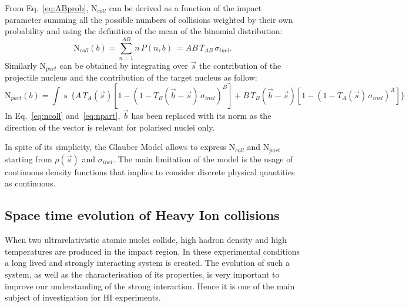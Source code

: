 From Eq.~\eqref{eq:ABprob}, $\mathrm{N}_{coll}$ can be derived as a function of the impact parameter 
summing all the possible numbers of collisions weighted by their own probability and using the
definition of the mean of the binomial distribution:
\begin{equation} \label{eq:ncoll}
    \mathrm{N}_{coll}(b) = \sum_{n=1}^{AB} n\, P(n,b) \ = AB\, T_{AB}\, \sigma_{inel}.
\end{equation}
Similarly $\mathrm{N}_{part}$ can be obtained by integrating over $\vec{s}$ the contribution of the
projectile nucleus and the contribution of the target nucleus as follow:
\begin{equation} \label{eq:npart}
    \mathrm{N}_{part}(b) = \int \mathop{d^{2}s} \, \bigl\{ A\, T_{A}(\vec{s})[1-(1- T_{B}(\vec{b}-\vec{s})\, \sigma_{inel})^{B}
    ] + B\, T_{B}(\vec{b}-\vec{s}) [1-(1-T_{A}(\vec{s})\,\sigma_{inel})^{A}] \bigr\}
\end{equation}
In Eq.~\eqref{eq:ncoll} and~\eqref{eq:npart}, $\vec{b}$ has been replaced with its norm as the direction 
of the vector is relevant for polarised nuclei only.

In spite of its simplicity, the Glauber Model allows to express $\mathrm{N}_{coll}$ and 
$\mathrm{N}_{part}$ starting from $\rho(\vec{s})$ and $\sigma_{inel}$. The main limitation of the model is the usage of continuous density functions that implies to consider discrete physical quantities 
as continuous.

%
\subsection{Space time evolution of Heavy Ion collisions} \label{sec:1.3.2}

When two ultrarelativistic atomic nuclei collide, high hadron density and high temperatures
are produced in the impact region. 
In these experimental conditions a long lived and strongly interacting system is created.
The evolution of such a system, as well as the characterisation of its properties, is very important
to improve our understanding of the strong interaction. Hence it is one of the main subject of 
investigation for HI experiments.

